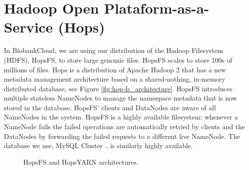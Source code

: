 \section{Hadoop Open Plataform-as-a-Service (Hops)}
In BiobankCloud, we are using our distribution of the Hadoop Filesystem (HDFS), HopsFS, to store large genomic files. HopsFS scales to store 100s of millions of files. Hops is a distribution of Apache Hadoop 2 that has a new metadata management architecture based on a shared-nothing, in-memory distributed database, see Figure \ref{fig:hop-fs_architecture}. HopsFS introduces multiple stateless NameNodes to manage the namespace metadata that is now stored in the database. HopsFS' clients and DataNodes are aware of all NameNodes in the system. HopsFS is a highly available filesystem: whenever a NameNode fails the failed operations are automatically retried by clients and the DataNodes by forwarding the failed requests to a different live NameNode. The database we use, MySQL Cluster~\cite{ronstrom2005recovery}, is similarly highly available.


\begin{figure}[!ht]
    \hfill
    \caption{HopsFS and HopsYARN architectures.}
    \label{fig:dummy}
  \end{figure}
  
